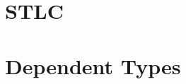 \documentclass[a4paper]{report}
\begin{document}
\tableofcontents
\todotoc\listoftodos
\chapter{STLC}


\newpage
\newpage

\chapter{Dependent Types}


\printbibliography
\end{document}
